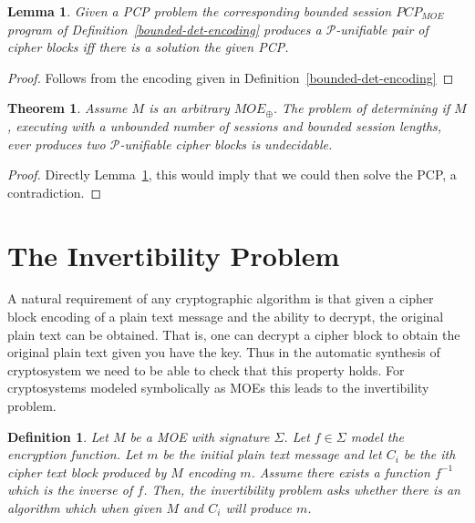 \documentclass{easychair}
\newtheorem{definition}{Definition}
\newtheorem{theorem}{Theorem}
\newtheorem{lemma}{Lemma}
\begin{document}
\begin{lemma}\label{lemma:det-bounded_pcp_to_moe}
	Given a PCP problem the corresponding
	bounded session $PCP_{MOE}$ program of Definition~\ref{bounded-det-encoding}
	produces a $\mathcal{P}$-unifiable pair of cipher blocks
	iff there is a solution the given PCP. 
\end{lemma}
\begin{proof}
	Follows from the encoding given in Definition~\ref{bounded-det-encoding}
\end{proof}

\begin{theorem}
	Assume $M$ is an arbitrary $MOE_{\oplus}$. The problem
	of determining if $M$, executing with 
	a unbounded number of sessions and bounded session
	lengths, ever produces two  $\mathcal{P}$-unifiable cipher blocks is undecidable. 
\end{theorem}
\begin{proof}
	Directly Lemma~\ref{lemma:det-bounded_pcp_to_moe}, this would
	imply that we could then solve the PCP, a contradiction.   
\end{proof}


\section{The Invertibility Problem}
A natural requirement of any cryptographic algorithm is that given a
cipher block encoding of a plain text message and the ability to decrypt, the original plain text can be obtained. That is, one can decrypt a cipher block to obtain the original plain text given you 
have the key. Thus in the automatic synthesis of cryptosystem we 
need to be able to check that this property holds. For cryptosystems
modeled symbolically as MOEs this leads to the invertibility problem.

\begin{definition}
Let $M$ be a MOE with signature $\Sigma$. Let $f \in \Sigma$ model 
the encryption function. Let $m$ be the initial plain text message
and let $C_i$ be the ith cipher text block produced by $M$
encoding $m$. 
Assume there exists a function $f^{-1}$ which is the inverse of $f$. 
Then, the \emph{invertibility problem} asks whether there is an 
algorithm which when given $M$ and $C_i$ will produce $m$. 
\end{definition}
\end{document}
